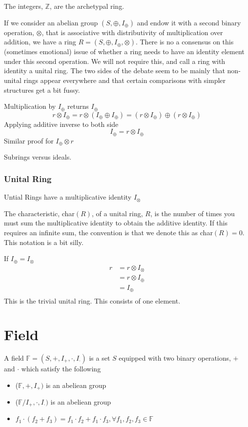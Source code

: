 \documentclass[a4paper]{scrartcl}
\begin{document}
The integers, $\mathbb{Z}$, are the archetypal ring.

If we consider an abelian group $(S, \oplus, I_{\oplus})$ and endow it with a second binary operation, $\otimes$, that is associative with distributivity of multiplication over addition, we have a ring $R = (S, \oplus, I_{\oplus}, \otimes)$. There is no a consensus on this (sometimes emotional) issue of whether a ring needs to have an identity element under this second operation. We will not require this, and call a ring with identity a unital ring. The two sides of the debate seem to be mainly that non-unital rings appear everywhere and that certain comparisons with simpler structures get a bit fussy.

Multiplication by $I_{\oplus}$ returns $I_{\oplus}$
$$r\otimes I_{\oplus} = r\otimes (I_{\oplus} \oplus I_{\oplus}) 
= (r\otimes I_{\oplus}) \oplus (r\otimes I_{\oplus})$$
Applying additive inverse to both side
$$I_{\oplus} = r\otimes I_{\oplus}$$
Similar proof for $I_{\oplus} \otimes r$



Subrings versus ideals.




\subsubsection{Unital Ring}
Untial Rings have a multiplicative identity $I_{\otimes}$

The characteristic, char$(R)$, of a unital ring, $R$, is the number of times you must sum the multiplicative identity to obtain the additive identity. If this requires an infinite sum, the convention is that we denote this as char$(R)=0$. This notation is a bit silly.

If $I_{\oplus}=I_{\otimes}$
\begin{align*}
r & = r \otimes I_{\otimes} \\ 
& = r \otimes I_{\oplus} \\
& = I_{\oplus} \\
\end{align*}
This is the trivial unital ring. This consists of one element.

 
\section{Field}
A field $\mathbb{F}=(S,+,I_{+},\cdot,I_{\cdot})$ is a set $S$ equipped with two binary operations, $+$ and $\cdot$ which satisfy the following
\begin{itemize}
\item{($\mathbb{F},+,I_{+})$ is an abeliean group}
\item{($\mathbb{F}/I_{+},\cdot,I_{\cdot})$ is an abeliean group}
\item{$f_{1} \cdot (f_{2} + f_{3}) = f_{1}\cdot f_{2} + f_{1} \cdot f_{3}, \forall f_{1}, f_{2}, f_{3} \in \mathbb{F}$}
\end{itemize}
\end{document}

